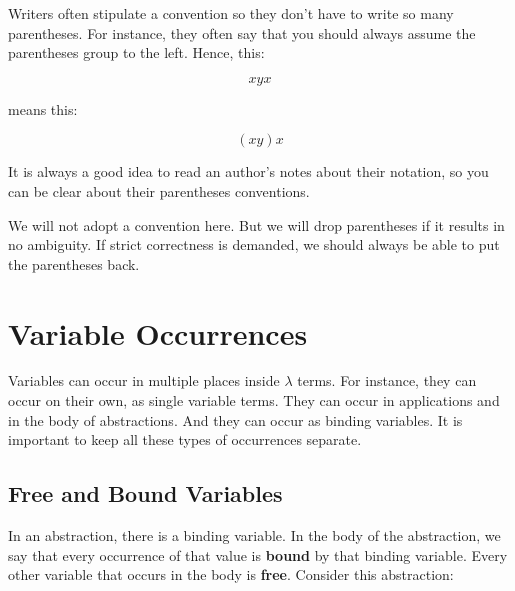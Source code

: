 \documentclass{book}
\numberwithin{equation}{chapter}
\newcommand{\vocab}{\textbf}
\begin{document}
Writers often stipulate a convention so they don't have to write so many parentheses. For instance, they often say that you should always assume the parentheses group to the left. Hence, this:

\begin{equation}
x y x
\end{equation}

\noindent
means this:

\begin{equation}
(x y) x
\end{equation}

\noindent
It is always a good idea to read an author's notes about their notation, so you can be clear about their parentheses conventions.

We will not adopt a convention here. But we will drop parentheses if it results in no ambiguity. If strict correctness is demanded, we should always be able to put the parentheses back.


\chapter{Variable Occurrences}

Variables can occur in multiple places inside $\lambda$ terms. For instance, they can occur on their own, as single variable terms. They can occur in applications and in the body of abstractions. And they can occur as binding variables. It is important to keep all these types of occurrences separate.


\section{Free and Bound Variables}

In an abstraction, there is a binding variable. In the body of the abstraction, we say that every occurrence of that value is \vocab{bound} by that binding variable. Every other variable that occurs in the body is \vocab{free}. Consider this abstraction:
\end{document}
